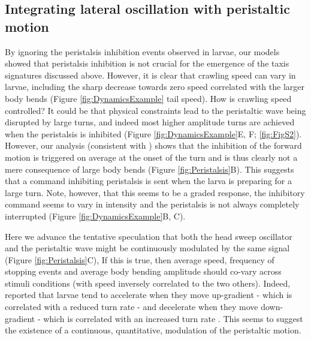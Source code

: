 \documentclass[11pt,a4paper]{article}
\begin{document}
\subsection{Integrating lateral oscillation with peristaltic motion}
By ignoring the peristalsis inhibition events observed in larvae, our models showed that peristalsis inhibition is not crucial for the emergence of the taxis signatures discussed above. However, it is clear that crawling speed can vary in larvae, including the sharp decrease towards zero speed correlated with the larger body bends (Figure \ref{fig:DynamicsExample} tail speed). How is crawling speed controlled? It could be that physical constraints lead to the peristaltic wave being disrupted by large turns, and indeed most higher amplitude turns are achieved when the peristalsis is inhibited (Figure \ref{fig:DynamicsExample}E, F; \ref{fig:FigS2}). However, our analysis (consistent with \citet{gepner2015computations,hernandez2015reverse}) shows that the inhibition of the forward motion is triggered on average at the onset of the turn and is thus clearly not a mere consequence of large body bends (Figure \ref{fig:Peristalsis}B). This suggests that a  command inhibiting peristalsis is sent when the larva is preparing for a large turn. Note, however, that this seems to be a graded response, the inhibitory command seems to vary in intensity and the peristalsis is not always completely interrupted (Figure \ref{fig:DynamicsExample}B, C).

Here we advance the tentative speculation that both the head sweep oscillator and the peristaltic wave might be continuously modulated by the same signal (Figure \ref{fig:Peristalsis}C), 
If this is true, then average speed, frequency of stopping events and average body bending amplitude should co-vary across stimuli conditions (with speed inversely correlated to the two others). Indeed, \cite{gomez2014multilevel} reported that larvae tend to accelerate when they move up-gradient - which is correlated with a reduced turn rate \citep{schleyer2015learning} - and decelerate when they move down-gradient - which is correlated with an increased turn rate \citep{schleyer2015learning}. This seems to suggest the existence of a continuous, quantitative, modulation of the peristaltic motion. 
\end{document}
